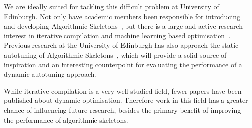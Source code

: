 We are ideally suited for tackling this difficult problem at
University of Edinburgh. Not only have academic members been
responsible for introducing and developing Algorithmic
Skeletons~\cite{Cole1989, Cole2004, Benoit2005a}, but there is a large
and active research interest in iterative compilation and machine
learning based optimisation~\cite{Fursin2008, Agakov,
Fursin2005}. Previous research at the University of Edinburgh has also
approach the static autotuning of Algorithmic
Skeletons~\cite{Collins2012, Collins2013}, which will provide a solid
source of inspiration and an interesting counterpoint for evaluating
the performance of a dynamic autotuning approach.

While iterative compilation is a very well studied field, fewer papers
have been published about dynamic optimisation. Therefore work in this
field has a greater chance of influencing future research, besides the
primary benefit of improving the performance of algorithmic skeletons.



